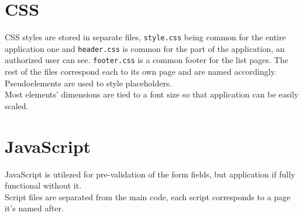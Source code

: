 \documentclass{article}
\begin{document}
\section{CSS}
CSS styles are stored in separate files, \texttt{style.css} being common for the entire application one and \texttt{header.css} is common for the part of the application, an authorized user can see. \texttt{footer.css} is a common footer for the list pages. The rest of the files correspond each to its own page and are named accordingly.\\
Pseudoelements are used to style placeholders.\\
Most elements' dimensions are tied to a font size so that application can be easily scaled.\\
\section{JavaScript}
JavaScript is utilezed for pre-validation of the form fields, but application if fully functional without it.\\
Script files are separated from the main code, each script corresponds to a page it's named after.
\end{document}
